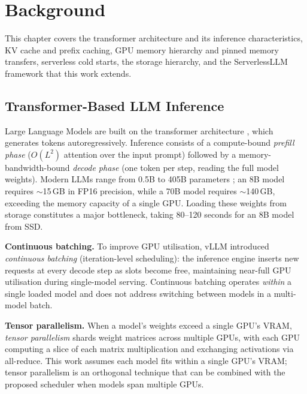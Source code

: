 \documentclass[logo,bsc,singlespacing,parskip,online]{infthesis}
\begin{document}

\chapter{Background}

This chapter covers the transformer architecture and its inference characteristics, KV cache and prefix caching, GPU memory hierarchy and pinned memory transfers, serverless cold starts, the storage hierarchy, and the ServerlessLLM framework that this work extends.

\section{Transformer-Based LLM Inference}

Large Language Models are built on the transformer architecture \citep{vaswani2017attention}, which generates tokens autoregressively. Inference consists of a compute-bound \textit{prefill phase} ($O(L^2)$ attention over the input prompt) followed by a memory-bandwidth-bound \textit{decode phase} (one token per step, reading the full model weights). Modern LLMs range from 0.5B to 405B parameters \citep{brown2020language, touvron2023llama}; an 8B model requires $\sim$15\,GB in FP16 precision, while a 70B model requires $\sim$140\,GB, exceeding the memory capacity of a single GPU. Loading these weights from storage constitutes a major bottleneck, taking 80--120 seconds for an 8B model from SSD.

\textbf{Continuous batching.} To improve GPU utilisation, vLLM \citep{kwon2023efficient} introduced \textit{continuous batching} (iteration-level scheduling): the inference engine inserts new requests at every decode step as slots become free, maintaining near-full GPU utilisation during single-model serving. Continuous batching operates \textit{within} a single loaded model and does not address switching between models in a multi-model batch.

\textbf{Tensor parallelism.} When a model's weights exceed a single GPU's VRAM, \textit{tensor parallelism} \citep{shoeybi2019megatron} shards weight matrices across multiple GPUs, with each GPU computing a slice of each matrix multiplication and exchanging activations via all-reduce. This work assumes each model fits within a single GPU's VRAM; tensor parallelism is an orthogonal technique that can be combined with the proposed scheduler when models span multiple GPUs.
\end{document}
